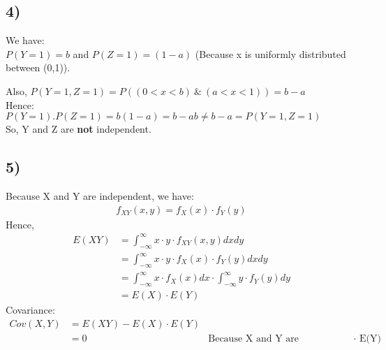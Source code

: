 \documentclass{article}
\begin{document}
\subsection*{4)}
We have:\\
$P(Y = 1) = b$ and $P(Z = 1) = (1 - a)$ (Because x is uniformly distributed between (0,1)).

Also, $P(Y = 1,Z = 1) = P((0 < x < b)\ \&\ (a < x < 1)) = b - a$\\

Hence:\\
$P(Y = 1).P(Z = 1) = b(1 - a) = b - ab \neq b - a = P(Y = 1,Z = 1)$\\
So, Y and Z are \textbf{not} independent.

\subsection*{5)}
Because X and Y are independent, we have:
\begin{align*}
f_{XY}(x,y) = f_{X}(x) \cdot f_{Y}(y)
\end{align*}
Hence,
\begin{align*}
E(XY) &= \int_{-\infty}^{\infty}x \cdot y \cdot f_{XY}(x,y)dxdy\\ 
&= \int_{-\infty}^{\infty}x \cdot y \cdot f_{X}(x) \cdot f_{Y}(y)dxdy\\
&= \int_{-\infty}^{\infty}x \cdot f_{X}(x)dx \cdot \int_{-\infty}^{\infty}y \cdot f_{Y}(y)dy\\
&= E(X) \cdot E(Y)
\end{align*}
Covariance:
\begin{align*}
Cov(X,Y) &= E(XY) - E(X) \cdot E(Y)\\
&= 0 & \text{Because X and Y are independent, so E(XY) = E(X) $\cdot$ E(Y)}
\end{align*}
\end{document}
